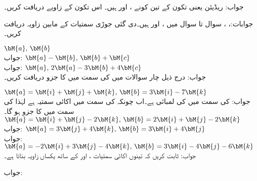 جواب: ریڈیئن یعنی 
تکون کے تین کونے ،  اور  ہیں۔ اس تکون کے زاویے دریافت کریں۔

جوابات:، ، 
سوال  تا سوال  میں ،  اور  ہیں۔دی گئی جوڑی سمتیات کے مابین زاویہ دریافت کریں۔

\quad
$\bM{a}, \, \bM{b}$\\
جواب:
\quad
$\bM{a}-\bM{b}, \, \bM{b}+\bM{c}$\\
جواب:
\quad
$\bM{a}, \, 2\bM{a}-3\bM{b}+4\bM{c}$\\
جواب:
درج ذیل چار سوالات میں  کی سمت میں  کا جزو دریافت کریں۔

\quad
$\bM{a}=\bM{i}+\bM{j}+\bM{k},\, \bM{b}=3\bM{i}-7\bM{k}$\\
جواب: کی سمت میں  کی لمبائی  ہے۔اب چونکہ  کی سمت میں اکائی سمتیہ
  ہے لہٰذا  کی سمت میں  کا جزو
  ہو گا۔
\quad
$\bM{a}=\bM{i}+\bM{j}-2\bM{k},\, \bM{b}=2\bM{i}+\bM{j}-2\bM{k}$\\
جواب:
\quad
$\bM{a}=3\bM{j}+4\bM{k},\, \bM{b}=3\bM{i}+4\bM{j}$\\
جواب:
\quad
$\bM{a}=-2\bM{i}+3\bM{j}-4\bM{k},\, \bM{b}=3\bM{i}-4\bM{j}-6\bM{k}$\\
جواب:
ثابت کریں کہ  تینوں اکائی سمتیات ،  اور  کے ساتھ یکساں زاویہ بناتا ہے۔

جواب:

